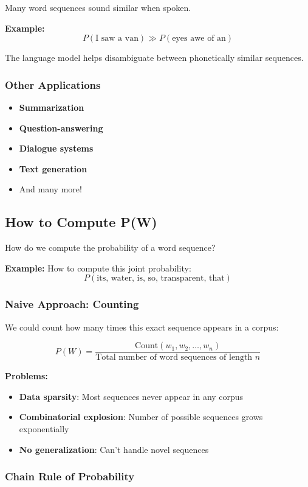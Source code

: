 \documentclass[11pt,a4paper]{article}
\theoremstyle{definition}
\theoremstyle{plain}
\theoremstyle{remark}
\begin{document}
Many word sequences sound similar when spoken.

\textbf{Example:}
\[
P(\text{I saw a van}) \gg P(\text{eyes awe of an})
\]

The language model helps disambiguate between phonetically similar sequences.

\subsubsection{Other Applications}

\begin{itemize}
    \item \textbf{Summarization}
    \item \textbf{Question-answering}
    \item \textbf{Dialogue systems}
    \item \textbf{Text generation}
    \item And many more!
\end{itemize}

\subsection{How to Compute P(W)}

How do we compute the probability of a word sequence?

\textbf{Example:} How to compute this joint probability:
\[
P(\text{its, water, is, so, transparent, that})
\]

\subsubsection{Naive Approach: Counting}

We could count how many times this exact sequence appears in a corpus:

\[
P(W) = \frac{\text{Count}(w_1, w_2, \ldots, w_n)}{\text{Total number of word sequences of length } n}
\]

\textbf{Problems:}
\begin{itemize}
    \item \textbf{Data sparsity}: Most sequences never appear in any corpus
    \item \textbf{Combinatorial explosion}: Number of possible sequences grows exponentially
    \item \textbf{No generalization}: Can't handle novel sequences
\end{itemize}

\subsubsection{Chain Rule of Probability}
\end{document}
